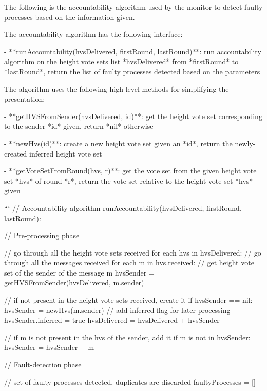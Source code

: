 \documentclass[a4paper,11pt,oneside]{report}
\begin{document}
\begin{markdown}
The following is the accountability algorithm used by the monitor to detect faulty processes based on the information given.

The accountability algorithm has the following interface:

- **runAccountability(hvsDelivered, firstRound, lastRound)**: run accountability algorithm on the height vote sets list *hvsDelivered* from *firstRound* to *lastRound*, return the list of faulty processes detected based on the parameters

The algorithm uses the following high-level methods for simplifying the presentation:

- **getHVSFromSender(hvsDelivered, id)**: get the height vote set corresponding to the sender *id* given, return *nil* otherwise 

- **newHvs(id)**: create a new height vote set given an *id*, return the newly-created inferred height vote set

- **getVoteSetFromRound(hvs, r)**: get the vote set from the given height vote set *hvs* of round *r*, return the vote set relative to the height vote set *hvs* given
    
    ```
    // Accountability algorithm
    runAccountability(hvsDelivered, firstRound, lastRound):
    
        // Pre-processing phase
                
        // go through all the height vote sets received
        for each hvs in hvsDelivered:
            // go through all the messages received
            for each m in hvs.received:
                // get height vote set of the sender of the message m
                hvsSender = getHVSFromSender(hvsDelivered, m.sender)
                
                // if not present in the height vote sets received, create it 
                if hvsSender == nil:
                    hvsSender = newHvs(m.sender)
                    // add inferred flag for later processing
                    hvsSender.inferred = true
                    hvsDelivered = hvsDelivered + hvsSender 
                
                // if m is not present in the hvs of the sender, add it
                if m is not in hvsSender:
                    hvsSender = hvsSender + m
                    
        // Fault-detection phase
        
        // set of faulty processes detected, duplicates are discarded
        faultyProcesses = []
        

\end{markdown}
\end{document}
